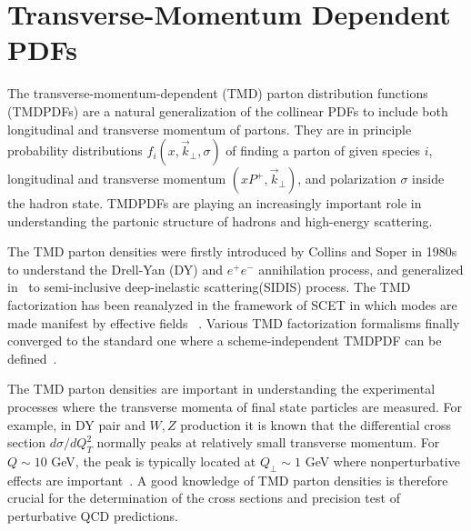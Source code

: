 \documentclass[aps,rmp,reprint,amsmath,amssymb,graphicx,longbibliography]{revtex4-1} %
\begin{document}
\section{Transverse-Momentum Dependent PDFs}
\label{sec:tmd}
The transverse-momentum-dependent (TMD) parton distribution functions (TMDPDFs) are a natural generalization
of the collinear PDFs to include both longitudinal and transverse momentum of partons.
They are in principle probability distributions $f_i(x,\vec{k}_\perp,\sigma)$ of finding a parton of given species $i$,
longitudinal and transverse momentum $(xP^+,\vec{k}_{\perp})$, and polarization $\sigma$
inside the hadron state. TMDPDFs are playing an increasingly important role in
understanding the partonic structure of hadrons and high-energy scattering.

The TMD parton densities were firstly introduced by Collins and Soper in 1980s~\cite{Collins:1981uk,Collins:1981va,Collins:1982wa,Collins:1984kg,Collins:1985ue,Bodwin:1984hc} to understand the Drell-Yan (DY) and $e^{+}e^{-}$ annihilation process, and generalized in~\cite{Ji:2004wu,Ji:2004xq} to semi-inclusive deep-inelastic scattering(SIDIS) process. The TMD factorization has been reanalyzed in the framework of SCET in which modes are made manifest by effective fields ~\cite{Bauer:2000yr,Bauer:2001yt,Manohar:2006nz,Becher:2010tm,GarciaEchevarria:2011rb,Echevarria:2012js,Chiu:2012ir}. Various TMD factorization formalisms finally converged to the standard one where a scheme-independent TMDPDF can be defined~\cite{Echevarria:2012js,Collins:2012uy,Collins:2017oxh}.

The TMD parton densities are important in understanding the experimental processes where the transverse momenta of final state particles are measured. For example, in DY pair and $W, Z$ production it is known that the differential cross section $d\sigma/dQ_T^2$ normally peaks at relatively small transverse momentum.  For $Q\sim 10 $ GeV, the peak is typically located at $Q_\perp\sim 1 $ GeV where nonperturbative effects are important~\cite{Collins:1984kg}. A good knowledge of TMD parton densities is therefore crucial for the determination of the
cross sections and precision test of perturbative QCD predictions.
\end{document}
